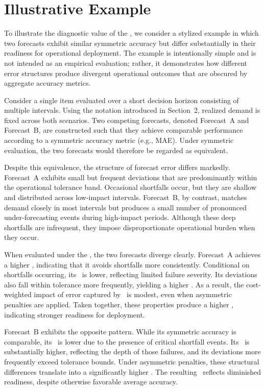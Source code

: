 \section{Illustrative Example}

To illustrate the diagnostic value of the \FRF, we consider a stylized example in which two
forecasts exhibit similar symmetric accuracy but differ substantially in their readiness for
operational deployment. The example is intentionally simple and is not intended as an empirical
evaluation; rather, it demonstrates how different error structures produce divergent operational
outcomes that are obscured by aggregate accuracy metrics.

Consider a single item evaluated over a short decision horizon consisting of multiple intervals.
Using the notation introduced in Section~2, realized demand is fixed across both scenarios.
Two competing forecasts, denoted Forecast~A and Forecast~B, are constructed such that they
achieve comparable performance according to a symmetric accuracy metric (e.g., MAE).
Under symmetric evaluation, the two forecasts would therefore be regarded as equivalent.

Despite this equivalence, the structure of forecast error differs markedly. Forecast~A exhibits
small but frequent deviations that are predominantly within the operational tolerance band.
Occasional shortfalls occur, but they are shallow and distributed across low-impact intervals.
Forecast~B, by contrast, matches demand closely in most intervals but produces a small number
of pronounced under-forecasting events during high-impact periods. Although these deep
shortfalls are infrequent, they impose disproportionate operational burden when they occur.

When evaluated under the \FRF, the two forecasts diverge clearly. Forecast~A achieves a higher
\NSL, indicating that it avoids shortfalls more consistently. Conditional on shortfalls occurring,
its \UD\ is lower, reflecting limited failure severity. Its deviations also fall within tolerance
more frequently, yielding a higher \HRtau. As a result, the cost-weighted impact of error captured
by \CWSL\ is modest, even when asymmetric penalties are applied. Taken together, these
properties produce a higher \FRS, indicating stronger readiness for deployment.

Forecast~B exhibits the opposite pattern. While its symmetric accuracy is comparable, its \NSL\
is lower due to the presence of critical shortfall events. Its \UD\ is substantially higher, reflecting
the depth of those failures, and its deviations more frequently exceed tolerance bounds. Under
asymmetric penalties, these structural differences translate into a significantly higher \CWSL.
The resulting \FRS\ reflects diminished readiness, despite otherwise favorable average accuracy.

